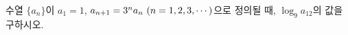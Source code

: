 \hspace*{2mm}\begin{minipage}[t]{\dimexpr\linewidth-2mm\relax}\vspace{0pt}
수열 $\{a_n\}$이 $a_1=1$, $a_{n+1}=3^na_n\ (n=1{,}\mkern3mu\mathopen{}2{,}\mkern3mu\mathopen{}3{,}\mkern3mu\mathopen{}\cdots)$으로 정의될 때, $\log_9 a_{12}$의 값을 구하시오.\end{minipage}
